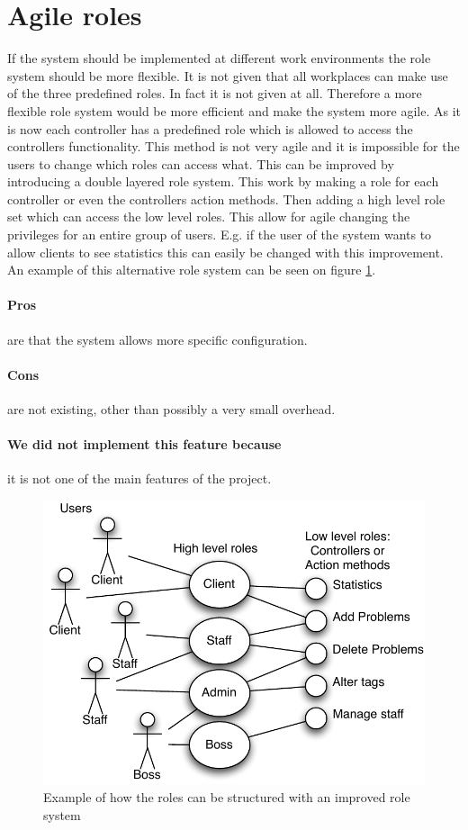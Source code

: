 \section{Agile roles}
\label{sec:agile_roles}
If the system should be implemented at different work environments the role system should be more flexible. 
It is not given that all workplaces can make use of the three predefined roles. 
In fact it is not given at all. 
Therefore a more flexible role system would be more efficient and make the system more agile. 
As it is now each controller has a predefined role which is allowed to access the controllers functionality. 
This method is not very agile and it is impossible for the users to change which roles can access what. 
This can be improved by introducing a double layered role system.  
This work by making a role for each controller or even the controllers action methods. 
Then adding a high level role set which can access the low level roles. 
This allow for agile changing the privileges for an entire group of users. 
E.g. if the user of the system wants to allow clients to see statistics this can easily be changed with this improvement. An example of this alternative role system can be seen on figure \ref{fig:improved_role_system}.

\paragraph{Pros} are that the system allows more specific configuration. 
\paragraph{Cons} are not existing, other than possibly a very small overhead.
\paragraph{We did not implement this feature because} it is not one of the main features of the project.

\begin{figure}
\begin{center}
\includegraphics[scale=1]{input/epilogue/improvements/improved_role_system.pdf}
\caption{Example of how the roles can be structured with an improved role system}
\label{fig:improved_role_system}
\end{center}
\end{figure}
